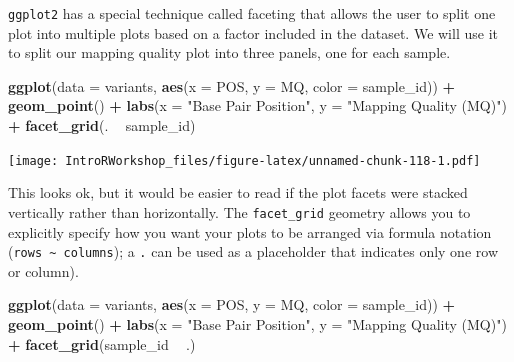 \documentclass[]{book}
\newenvironment{Shaded}{\begin{snugshade}}{\end{snugshade}}
\newcommand{\DataTypeTok}[1]{\textcolor[rgb]{0.13,0.29,0.53}{#1}}
\newcommand{\KeywordTok}[1]{\textcolor[rgb]{0.13,0.29,0.53}{\textbf{#1}}}
\newcommand{\NormalTok}[1]{#1}
\newcommand{\OperatorTok}[1]{\textcolor[rgb]{0.81,0.36,0.00}{\textbf{#1}}}
\newcommand{\StringTok}[1]{\textcolor[rgb]{0.31,0.60,0.02}{#1}}
\begin{document}
\texttt{ggplot2} has a special technique called faceting that allows the user to split one plot into multiple plots based on a factor included in the dataset. We will use it to split our mapping quality plot into three panels, one for each sample.

\begin{Shaded}
\begin{Highlighting}[]
\KeywordTok{ggplot}\NormalTok{(}\DataTypeTok{data =}\NormalTok{ variants, }\KeywordTok{aes}\NormalTok{(}\DataTypeTok{x =}\NormalTok{ POS, }\DataTypeTok{y =}\NormalTok{ MQ, }\DataTypeTok{color =}\NormalTok{ sample_id)) }\OperatorTok{+}\StringTok{ }
\StringTok{ }\KeywordTok{geom_point}\NormalTok{() }\OperatorTok{+}\StringTok{ }
\StringTok{ }\KeywordTok{labs}\NormalTok{(}\DataTypeTok{x =} \StringTok{"Base Pair Position"}\NormalTok{, }
      \DataTypeTok{y =} \StringTok{"Mapping Quality (MQ)"}\NormalTok{) }\OperatorTok{+}\StringTok{ }
\StringTok{ }\KeywordTok{facet_grid}\NormalTok{(. }\OperatorTok{~}\StringTok{ }\NormalTok{sample_id)}
\end{Highlighting}
\end{Shaded}

\texttt{[image: IntroRWorkshop\_files/figure-latex/unnamed-chunk-118-1.pdf]}

This looks ok, but it would be easier to read if the plot facets were stacked vertically rather than horizontally. The \texttt{facet\_grid} geometry allows you to explicitly specify how you want your plots to be arranged via formula notation (\texttt{rows\ \textasciitilde{}\ columns}); a \texttt{.} can be used as a placeholder that indicates only one row or column).

\begin{Shaded}
\begin{Highlighting}[]
\KeywordTok{ggplot}\NormalTok{(}\DataTypeTok{data =}\NormalTok{ variants, }\KeywordTok{aes}\NormalTok{(}\DataTypeTok{x =}\NormalTok{ POS, }\DataTypeTok{y =}\NormalTok{ MQ, }\DataTypeTok{color =}\NormalTok{ sample_id)) }\OperatorTok{+}\StringTok{ }
\StringTok{ }\KeywordTok{geom_point}\NormalTok{() }\OperatorTok{+}\StringTok{ }
\StringTok{ }\KeywordTok{labs}\NormalTok{(}\DataTypeTok{x =} \StringTok{"Base Pair Position"}\NormalTok{, }
      \DataTypeTok{y =} \StringTok{"Mapping Quality (MQ)"}\NormalTok{) }\OperatorTok{+}\StringTok{ }
\StringTok{ }\KeywordTok{facet_grid}\NormalTok{(sample_id }\OperatorTok{~}\StringTok{ }\NormalTok{.)}
\end{Highlighting}
\end{Shaded}
\end{document}
